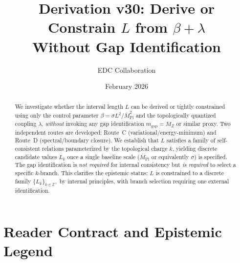 \documentclass[11pt,a4paper]{article}
\title{Derivation v30: Derive or Constrain $L$ from $\beta + \lambda$\\[0.5em]
\large Without Gap Identification}
\author{EDC Collaboration}
\date{February 2026}
\begin{document}
\maketitle

\begin{abstract}
We investigate whether the interval length $L$ can be derived or tightly constrained
using only the control parameter $\beta = \sigma L^2/\bar{M}_{\text{Pl}}^2$ and the
topologically quantized coupling $\lambda$, \emph{without} invoking any gap
identification $m_{\text{gap}} = M_Z$ or similar proxy. Two independent routes are
developed: Route~C (variational/energy-minimum) and Route~D (spectral/boundary
closure). We establish that $L$ satisfies a family of self-consistent relations
parameterized by the topological charge $k$, yielding discrete candidate values
$L_k$ once a single baseline scale ($\bar{M}_{\text{Pl}}$ or equivalently $\sigma$)
is specified. The gap identification is \emph{not required} for internal consistency
but \emph{is required} to select a specific $k$-branch. This clarifies the epistemic
status: $L$ is constrained to a discrete family $\{L_k\}_{k \in \mathbb{Z}^+}$ by
internal principles, with branch selection requiring one external identification.
\end{abstract}

\tableofcontents
\newpage

\section{Reader Contract and Epistemic Legend}
\end{document}
